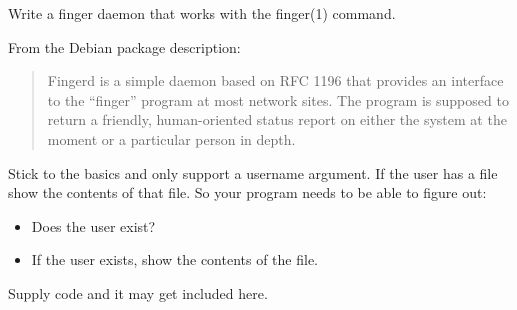 \begin{Exercise}[title={*Finger daemon},difficulty=8]
\label{ex:finger}
\Question
Write a finger daemon that works with the finger(1) command. 

From the Debian package description:
\begin{quote}
Fingerd is a simple daemon based on RFC 1196 \cite{RFC1196} that provides an interface to the
``finger'' program at most network sites.  The program is supposed to return a
friendly, human-oriented status report on either the system at the moment or a
particular person in depth.
\end{quote}

Stick to the basics and only support a username argument. If the user has a  file
show the contents of that file. So your program needs to be able to figure out:
\begin{itemize}
\item Does the user exist?
\item If the user exists, show the contents of the  file.
\end{itemize}
\end{Exercise}

\begin{Answer}
\Question
Supply code and it may get included here.
\end{Answer}
